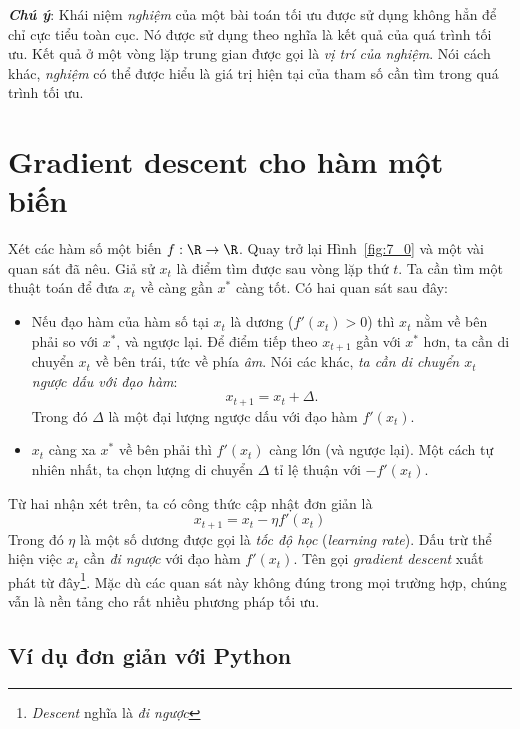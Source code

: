 \textit{\textbf{Chú ý}}: Khái niệm \textit{nghiệm} của một bài toán tối ưu được sử dụng không hẳn để chỉ cực tiểu toàn cục. Nó được sử dụng theo nghĩa là kết quả của quá trình tối ưu. Kết quả ở một vòng lặp trung gian được gọi là \textit{vị trí của nghiệm}. Nói cách khác, \textit{nghiệm} có thể được hiểu là giá trị hiện tại của tham số cần tìm trong quá trình tối ưu. 
 
 
 
\section{Gradient descent cho hàm một biến}
Xét các hàm số một biến $f: \R \rightarrow \R$. Quay trở lại Hình~\ref{fig:7_0}
và một vài quan sát đã nêu. Giả sử  $x_{t}$ là điểm tìm được sau vòng lặp thứ
$t$. Ta cần tìm một thuật toán để đưa $x_{t}$ về càng gần $x^*$ càng tốt. Có hai
quan sát sau đây:
\begin{itemize}
    \item Nếu đạo hàm của hàm số tại $x_{t}$ là dương ($f'(x_{t}) > 0$) thì
    $x_t$ nằm
    về bên phải so với $x^*$, và ngược lại. Để điểm tiếp theo $x_{t+1}$ gần với
    $x^*$ hơn, ta cần di chuyển $x_t$ về bên trái, tức về phía
    \textit{âm}. Nói các khác, \textit{ta cần di chuyển $x_t$ ngược dấu với đạo hàm}:
    \begin{equation} 
    x_{t+1} = x_t + \Delta.
    \end{equation} 
    Trong đó $\Delta$ là một đại lượng ngược dấu với đạo hàm $f'(x_t)$. 
    
    \item $x_t$ càng xa $x^*$ về bên phải thì $f'(x_t)$ càng lớn (và
    ngược lại). Một cách tự nhiên nhất, ta chọn lượng di chuyển $\Delta$ tỉ lệ
    thuận với $-f'(x_t)$.
 \end{itemize} 
Từ hai nhận xét trên, ta có công thức cập nhật đơn giản là
\begin{equation} 
\boxed{
x_{t+1} = x_t - \eta f'(x_t)
}
\end{equation} 
Trong đó $\eta$ là một số dương được gọi là \textit{tốc độ học}
(\textit{learning rate}). Dấu trừ thể hiện việc $x_t$ cần \textit{đi ngược} với
đạo hàm $f'(x_t)$. Tên gọi \textit{gradient descent} xuất phát từ đây\footnote{
\textit{Descent} nghĩa là \textit{đi ngược}}. Mặc dù các quan sát này không đúng
trong mọi trường hợp, chúng vẫn là nền tảng cho rất nhiều phương pháp tối ưu.
 
\subsection{Ví dụ đơn giản với Python}
 
